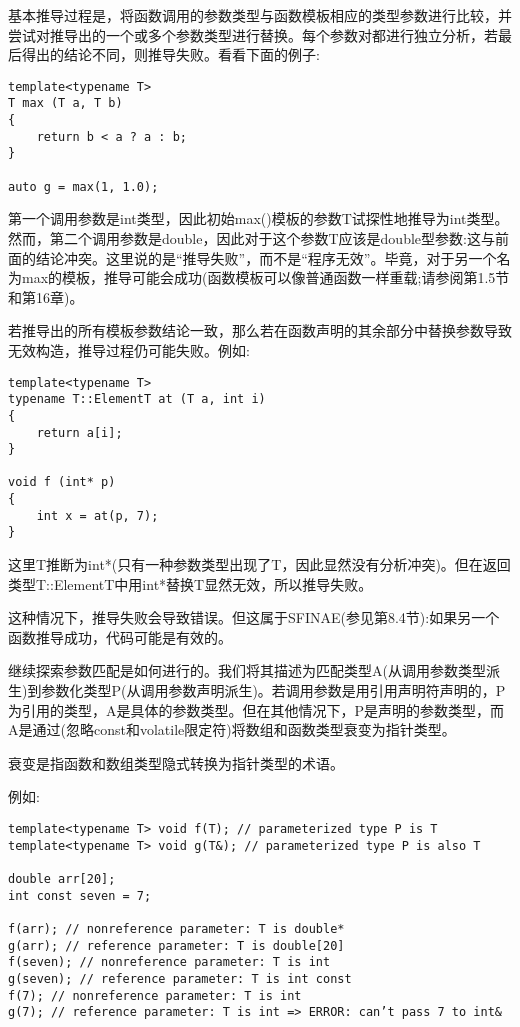 基本推导过程是，将函数调用的参数类型与函数模板相应的类型参数进行比较，并尝试对推导出的一个或多个参数类型进行替换。每个参数对都进行独立分析，若最后得出的结论不同，则推导失败。看看下面的例子:
 
\begin{lstlisting}[style=styleCXX]
template<typename T>
T max (T a, T b)
{
	return b < a ? a : b;
}

auto g = max(1, 1.0);
\end{lstlisting} 
 
第一个调用参数是int类型，因此初始max()模板的参数T试探性地推导为int类型。然而，第二个调用参数是double，因此对于这个参数T应该是double型参数:这与前面的结论冲突。这里说的是“推导失败”，而不是“程序无效”。毕竟，对于另一个名为max的模板，推导可能会成功(函数模板可以像普通函数一样重载;请参阅第1.5节和第16章)。
 
若推导出的所有模板参数结论一致，那么若在函数声明的其余部分中替换参数导致无效构造，推导过程仍可能失败。例如:

\begin{lstlisting}[style=styleCXX]
template<typename T>
typename T::ElementT at (T a, int i)
{
	return a[i];
}

void f (int* p)
{
	int x = at(p, 7);
}
\end{lstlisting} 

这里T推断为int*(只有一种参数类型出现了T，因此显然没有分析冲突)。但在返回类型T::ElementT中用int*替换T显然无效，所以推导失败。

\begin{tcolorbox}[colback=webgreen!5!white,colframe=webgreen!75!black]
\hspace*{0.75cm}这种情况下，推导失败会导致错误。但这属于SFINAE(参见第8.4节):如果另一个函数推导成功，代码可能是有效的。
\end{tcolorbox}

继续探索参数匹配是如何进行的。我们将其描述为匹配类型A(从调用参数类型派生)到参数化类型P(从调用参数声明派生)。若调用参数是用引用声明符声明的，P为引用的类型，A是具体的参数类型。但在其他情况下，P是声明的参数类型，而A是通过(忽略const和volatile限定符)将数组和函数类型衰变为指针类型。

\begin{tcolorbox}[colback=webgreen!5!white,colframe=webgreen!75!black]
\hspace*{0.75cm}衰变是指函数和数组类型隐式转换为指针类型的术语。
\end{tcolorbox}

例如:

\begin{lstlisting}[style=styleCXX]
template<typename T> void f(T); // parameterized type P is T
template<typename T> void g(T&); // parameterized type P is also T

double arr[20];
int const seven = 7;

f(arr); // nonreference parameter: T is double*
g(arr); // reference parameter: T is double[20]
f(seven); // nonreference parameter: T is int
g(seven); // reference parameter: T is int const
f(7); // nonreference parameter: T is int
g(7); // reference parameter: T is int => ERROR: can’t pass 7 to int&
\end{lstlisting} 

